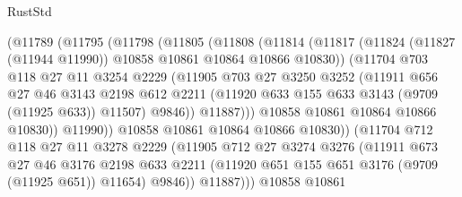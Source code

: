 \begin{lexlean}{RustStd}
\begin{coremodule}
                    (@11789
                      (@11795
                        (@11798
                          (@11805
                            (@11808
                              (@11814
                                (@11817
                                  (@11824
                                    (@11827 (@11944 @11990))
                                    @10858
                                    @10861
                                    @10864
                                    @10866
                                    @10830))
                                (@11704
                                  @703
                                  @118
                                  @27
                                  @11
                                  @3254
                                  @2229
                                  (@11905
                                    @703
                                    @27
                                    @3250
                                    @3252
                                    (@11911
                                      @656
                                      @27
                                      @46
                                      @3143
                                      @2198
                                      @612
                                      @2211
                                      (@11920 @633 @155 @633 @3143 (@9709 (@11925 @633)) @11507)
                                      @9846))
                                  @11887)))
                            @10858
                            @10861
                            @10864
                            @10866
                            @10830))
                        @11990))
                    @10858
                    @10861
                    @10864
                    @10866
                    @10830))
                (@11704
                  @712
                  @118
                  @27
                  @11
                  @3278
                  @2229
                  (@11905
                    @712
                    @27
                    @3274
                    @3276
                    (@11911
                      @673
                      @27
                      @46
                      @3176
                      @2198
                      @633
                      @2211
                      (@11920 @651 @155 @651 @3176 (@9709 (@11925 @651)) @11654)
                      @9846))
                  @11887)))
            @10858
            @10861

\end{coremodule}
\end{lexlean}

